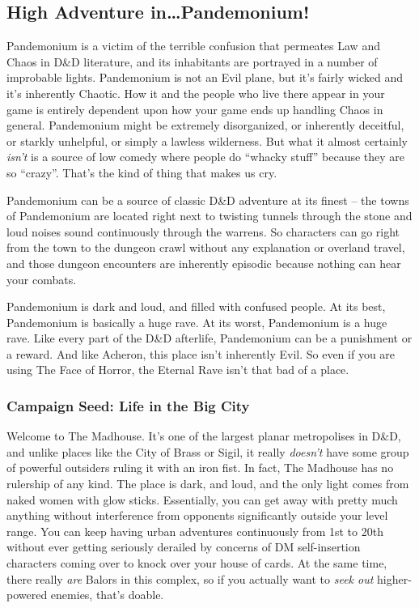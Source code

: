 \subsection{High Adventure in\ldots Pandemonium!}

Pandemonium is a victim of the terrible confusion that permeates Law and Chaos in D\&D literature, and its inhabitants are portrayed in a number of improbable lights. Pandemonium is not an Evil plane, but it's fairly wicked and it's inherently Chaotic. How it and the people who live there appear in your game is entirely dependent upon how your game ends up handling Chaos in general. Pandemonium might be extremely disorganized, or inherently deceitful, or starkly unhelpful, or simply a lawless wilderness. But what it almost certainly \textit{isn't} is a source of low comedy where people do ``whacky stuff'' because they are so ``crazy''. That's the kind of thing that makes us cry.

Pandemonium can be a source of classic D\&D adventure at its finest -- the towns of Pandemonium are located right next to twisting tunnels through the stone and loud noises sound continuously through the warrens. So characters can go right from the town to the dungeon crawl without any explanation or overland travel, and those dungeon encounters are inherently episodic because nothing can hear your combats.

Pandemonium is dark and loud, and filled with confused people. At its best, Pandemonium is basically a huge rave. At its worst, Pandemonium is a huge rave. Like every part of the D\&D afterlife, Pandemonium can be a punishment or a reward. And like Acheron, this place isn't inherently Evil. So even if you are using The Face of Horror, the Eternal Rave isn't that bad of a place.

\subsubsection{Campaign Seed: Life in the Big City}

Welcome to The Madhouse. It's one of the largest planar metropolises in D\&D, and unlike places like the City of Brass or Sigil, it really \textit{doesn't} have some group of powerful outsiders ruling it with an iron fist. In fact, The Madhouse has no rulership of any kind. The place is dark, and loud, and the only light comes from naked women with glow sticks. Essentially, you can get away with pretty much anything without interference from opponents significantly outside your level range. You can keep having urban adventures continuously from 1st to 20th without ever getting seriously derailed by concerns of DM self-insertion characters coming over to knock over your house of cards. At the same time, there really \textit{are} Balors in this complex, so if you actually want to \textit{seek out} higher-powered enemies, that's doable.

